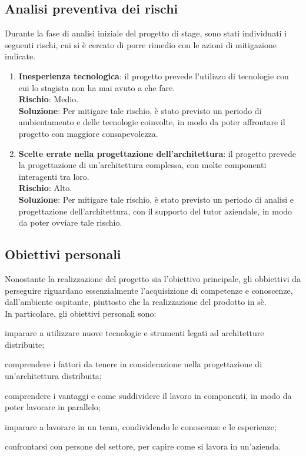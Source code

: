 \subsection{Analisi preventiva dei rischi}
Durante la fase di analisi iniziale del progetto di stage, sono stati individuati i seguenti rischi, cui si è cercato di porre rimedio con le azioni di mitigazione indicate. \\
\begin{enumerate}
    \item \textbf{Inesperienza tecnologica}: il progetto prevede l'utilizzo di tecnologie con cui lo stagista non ha mai avuto a che fare. \\
    \textbf{Rischio}: Medio.\\
    \textbf{Soluzione}: Per mitigare tale rischio, è stato previsto un periodo di ambientamento e delle tecnologie coinvolte, in modo da poter affrontare il progetto con maggiore consapevolezza.
    \item \textbf{Scelte errate nella progettazione dell'architettura}: il progetto prevede la progettazione di un'architettura complessa, con molte componenti interagenti tra loro. \\
    \textbf{Rischio}: Alto.\\
    \textbf{Soluzione}: Per mitigare tale rischio, è stato previsto un periodo di analisi e progettazione dell'architettura, con il supporto del tutor aziendale, in modo da poter ovviare tale rischio.

\end{enumerate}    
\subsection{Obiettivi personali}
Nonostante la realizzazione del progetto sia l'obiettivo principale, gli obbiettivi da perseguire riguardano essenzialmente l'acquisizione di competenze e conoscenze, dall'ambiente ospitante, piuttosto che la realizzazione del prodotto in sè. \\
\pagebreak
In particolare, gli obiettivi personali sono:
\begin{list}{*}{}
    \item imparare a utilizzare nuove tecnologie e strumenti legati ad architetture distribuite;
    \item comprendere i fattori da tenere in considerazione nella progettazione di un'architettura distribuita;
    \item comprendere i vantaggi e come suddividere il lavoro in componenti, in modo da poter lavorare in parallelo;
    \item imparare a lavorare in un team, condividendo le conoscenze e le esperienze;
    \item confrontarsi con persone del settore, per capire come si lavora in un'azienda.
\end{list}
\newpage
\pagestyle{empty}
\null %

\newpage